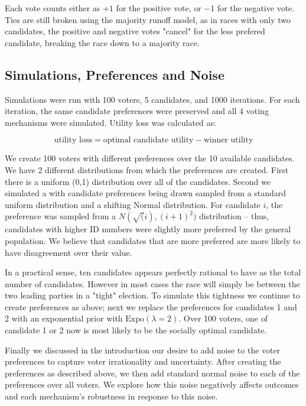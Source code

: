 \documentclass[11pt]{scrartcl}
\newcommand{\Expo}{\textrm{Expo}}
\begin{document}
Each vote counts either as $+1$ for the positive vote, or $-1$ for the negative vote. Ties are still broken using the majority runoff model, as in races with only two candidates, the positive and negative votes "cancel" for the less prefered candidate, breaking the race down to a majority race.

\subsection{Simulations, Preferences and Noise}

Simulations were run with 100 voters, 5 candidates, and 1000 iterations. For each iteration, the same candidate preferences were preserved and all 4 voting mechanisms were simulated. Utility loss was calculated as:

\[\textrm{utility loss} = \textrm{optimal candidate utility} - \textrm{winner utility}\]


We create 100 voters with different preferences over the 10 available candidates. We have 2 different distributions from which the preferences are created. First there is a uniform (0,1) distribution over all of the candidates. Second we simulated a with candidate preferences being drawn sampled from a standard uniform distribution and a shifting Normal distribution. For candidate $i$, the preference was sampled from a $N(\sqrt(i), (i + 1)^2)$ distribution -- thus, candidates with higher ID numbers were slightly more preferred by the general population. We believe that candidates that are more preferred are more likely to have disagreement over their value.

In a practical sense, ten candidates appears perfectly rational to have as the total number of candidates. However in most cases the race will simply be between the two leading parties in a "tight" election. To simulate this tightness we continue to create preferences as above; next we replace the preferences for candidates 1 and 2 with an exponential prior with $\Expo(\lambda = 2)$. Over 100 voters, one of candidate 1 or 2 now is most likely to be the socially optimal candidate.

Finally we discussed in the introduction our desire to add noise to the voter preferences to capture voter irrationality and uncertainty. After creating the preferences as described above, we then add standard normal noise to each of the preferences over all voters. We explore how this noise negatively affects outcomes and each mechanism's robustness in response to this noise.
\end{document}
